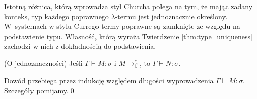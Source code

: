 Istotną różnica, którą wprowadza styl Churcha polega na tym, że mając zadany konteks, typ każdego poprawnego \(\lambda\)-termu jest jednoznacznie określony. W~systemach w stylu Currego termy poprawne są zamknięte ze względu na podstawienie typu. Własność, którą wyraża Twierdzenie \ref{thm:type_uniqueness} zachodzi w nich z dokładnością do podstawienia. 

\begin{twierdzenie}\label{thm:type_uniqueness}(O jednoznaczności)
  Jeśli \(\Gamma\vdash M:\sigma\) i \(M\to^{*}_\beta\), to \(\Gamma\vdash N:\sigma\).
\end{twierdzenie}
\begin{dowod}
  Dowód przebiega przez indukcję względem długości wyprowadzenia \(\Gamma\vdash M:\sigma\). Szczegóły pomijamy.\qed
\end{dowod}

